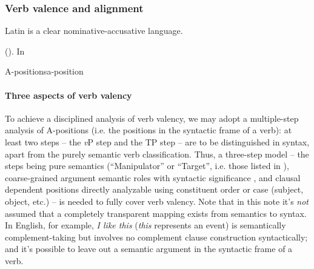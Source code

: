 \documentclass[a4paper, oneside]{report}
\newcommand*{\citesec}[1]{\S~{#1}}
\newcommand{\form}[1]{\emph{#1}}
\newcommand{\vP}{\textit{v}P}
\begin{document}
\subsubsection{Verb valence and alignment}

Latin is a clear nominative-accusative language.

().
In 

\begin{theorybox}{A-positions}{a-position}
    \paragraph*{Three aspects of verb valency} 
    To achieve a disciplined analysis of verb valency, 
    we may adopt a multiple-step analysis of A-positions
    (i.e. the positions in the syntactic frame of a verb):
    at least two steps -- the \vP{} step and the TP step 
    -- are to be distinguished in syntax, 
    apart from the purely semantic verb classification.
    Thus, a three-step model -- 
    the steps being pure semantics
    (``Manipulator'' or ``Target'', i.e. those listed in \citet{dixon2005semantic}), 
    coarse-grained argument semantic roles with syntactic significance 
    \citep[\citesec{4.2}]{cgel}, 
    and clausal dependent positions directly analyzable using constituent order or case
    (subject, object, etc.) -- 
    is needed to fully cover verb valency.
    Note that in this note it's \emph{not} assumed that 
    a completely transparent mapping exists 
    from semantics to syntax.
    In English, for example, \form{I like this} 
    (\form{this} represents an event)
    is semantically complement-taking 
    but involves no complement clause construction syntactically;
    and it's possible to leave out a semantic argument in the syntactic frame of a verb.


\end{theorybox}
\end{document}
